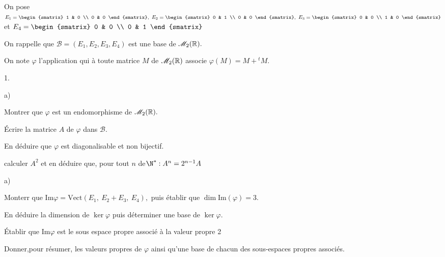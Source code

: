 \documentclass[11pt]{article}%
\begin{document}
On pose $E_{1} = 
\begin{smatrix}
1 & 0 \\
0 & 0
\end{smatrix},\ E_{2} = 
\begin{smatrix}
0 & 1 \\
0 & 0
\end{smatrix},\ E_{3} = 
\begin{smatrix}
0 & 0 \\
1 & 0
\end{smatrix}
$ et $E_{4} = 
\begin{smatrix}
0 & 0 \\
0 & 1
\end{smatrix}
$

On rappelle que $\mathcal{B = }\left( E_{1},E_{2},E_{3},E_{4}\right) $
est une
base de $\mathscr{M}_{2}(\mathbb{R}).$

On note $\varphi $ l'application qui à toute matrice $M$ de $\mathscr{M}_{2}(\mathbb{R}) $
associe $\varphi \left( M\right) = M + \left.
^{t}M\right..$

\begin{noliste}{1.}
 \setlength{\itemsep}{4mm}
\item 
\begin{noliste}{a)}
 \setlength{\itemsep}{2mm}
\item Montrer que $\varphi $ est un endomorphisme de $\mathscr{M}_{2}(\mathbb{R}).$

\item Écrire la matrice $A$ de $\varphi $ dans $\mathcal{B}.$

\item En déduire que $\varphi $ est diagonalisable et non bijectif.
\end{noliste}

\item calculer $A^{2}$ et en déduire que, pour tout $n$ de$\N^{\ast }
:A^{n} = 2^{n-1}A$

\item 
\begin{noliste}{a)}
 \setlength{\itemsep}{2mm}
\item Monterr que $\mathrm{Im}\varphi = \mathrm{Vect}\left( E_{1},\
E_{2} + E_{3},\ E_{4}\right),$ puis établir que $\dim \mathrm{Im}\left(
\varphi \right) = 3.$

\item En déduire la dimension de $\ker \varphi $ puis déterminer une
base de $\ker \varphi.$

\item Établir que $\mathrm{Im}\varphi $ est le sous espace propre
associé
à la valeur propre 2

\item Donner,pour résumer, les valeurs propres de $\varphi $ ainsi
qu'une base de chacun des sous-espaces propres associés.
\end{noliste}
\end{noliste}
\end{document}
